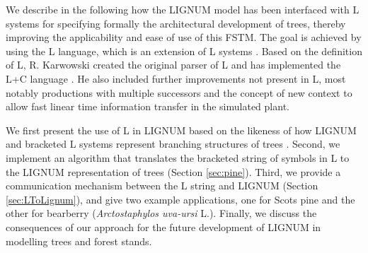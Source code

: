We describe in the following how  the LIGNUM model has been interfaced
with L systems for  specifying formally the architectural  development
of trees, thereby improving the applicability and ease  of use of this
FSTM.   The goal  is achieved  by using  the L  language, which is  an
extension of L systems \citep{pp:99a}.  Based  on the definition of L,
R.  Karwowski created the original parser of L and has implemented the
L+C   language   \citep{karwowski:02}.    He   also  included  further
improvements not present in L, most  notably productions with multiple
successors and  the concept of   new context  \citep{karwowski:03}  to
allow fast linear time information transfer in the simulated plant.

We first present the  use of L in LIGNUM based on  the likeness of how
LIGNUM and bracketed L systems represent branching structures of trees
\citep{perttunen:96, perttunen:01}.  Second, we implement an algorithm
that translates  the bracketed  string of symbols  in L to  the LIGNUM
representation of trees (Section \ref{sec:pine}).  Third, we provide a
communication  mechanism  between the  L  string  and LIGNUM  (Section
\ref{sec:LToLignum}), and give two example applications, one for Scots
pine  and the  other for  bearberry  (\textit{Arctostaphylos uva-ursi}
L.).  Finally,  we discuss  the consequences of  our approach  for the
future development of LIGNUM in modelling trees and forest stands.

